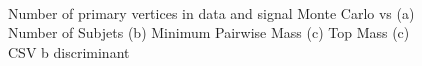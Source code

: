 \begin{figure}[Htcb]
\begin{center}
\\
\caption{
Number of primary vertices in data and signal Monte Carlo vs
(a) Number of Subjets  
(b) Minimum Pairwise Mass
(c) Top Mass
(c) CSV b discriminant 
}
\label{figs:PUplots}
\end{center}
\end{figure}


